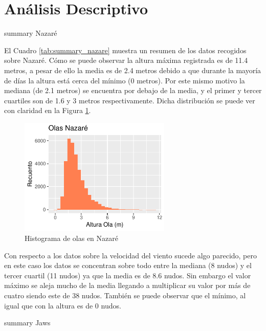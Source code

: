 \section{Análisis Descriptivo}%
\label{sec:metodos}

\begin{table}[htbp]
    \centering
    
    \caption{summary Nazaré}
    \label{tab:summary_nazare}
\end{table}

El Cuadro \ref{tab:summary_nazare} muestra un resumen de los datos recogidos sobre Nazaré. Cómo se puede observar la altura máxima registrada es de 11.4 metros, a pesar de ello la media es de 2.4 metros debido a que durante la mayoría de días la altura está cerca del mínimo (0 metros). Por este mismo motivo la mediana (de 2.1 metros) se encuentra por debajo de la media, y el primer y tercer cuartiles son de 1.6 y 3 metros respectivamente. Dicha distribución se puede ver con claridad en la Figura \ref{fig:hist_waves_nazare}.

\begin{figure}[H]
    \centering
    \includegraphics[height=5.6cm]{./figures/nazare_hist_wave.pdf}
    \caption{Histograma de olas en Nazaré}
    \label{fig:hist_waves_nazare}
\end{figure}

Con respecto a los datos sobre la velocidad del viento sucede algo parecido, pero en este caso los datos se concentran sobre todo entre la mediana (8 nudos) y el tercer cuartil (11 nudos) ya que la media es de 8.6 nudos. Sin embargo el valor máximo se aleja mucho de la media llegando a multiplicar su valor por más de cuatro siendo este de 38 nudos. También se puede observar que el mínimo, al igual que con la altura es de 0 nudos.


\begin{table}[htbp]
    \centering
    
    \caption{summary Jaws}
    \label{tab:summary_jaws}
\end{table}


